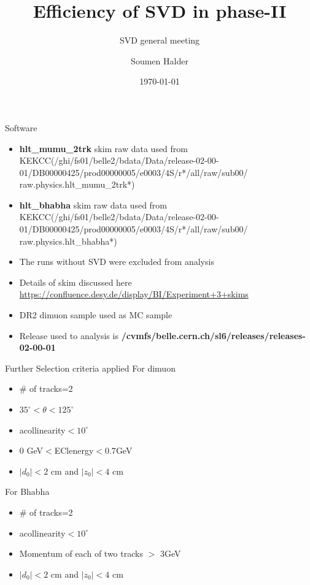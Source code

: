 \documentclass[xcolor=dvipsnames]{beamer}
\begin{document}
		\title{Efficiency of SVD in phase-II }
		   
		\author{Soumen Halder} 
		\date{\today} 
			\subtitle{ SVD general meeting }
		\frame{\titlepage}
		
\begin{frame}{Software}
	\begin{itemize}
		\item \textbf{hlt\_mumu\_2trk} skim raw data used from KEKCC(/ghi/fs01/belle2/bdata/Data/release-02-00-01/DB00000425/prod00000005/e0003/4S/r*/all/raw/sub00/\\raw.physics.hlt\_mumu\_2trk*) 
		\item \textbf{hlt\_bhabha} skim raw data used from KEKCC(/ghi/fs01/belle2/bdata/Data/release-02-00-01/DB00000425/prod00000005/e0003/4S/r*/all/raw/sub00/\\raw.physics.hlt\_bhabha*) 
		\item The runs without SVD were excluded from analysis
		\item Details of skim discussed here \\ \url{https://confluence.desy.de/display/BI/Experiment+3+skims}
		\item DR2 dimuon sample used as MC sample
		\item Release used to analysis is \textbf{/cvmfs/belle.cern.ch/sl6/releases/releases-02-00-01}
	\end{itemize}
\end{frame}
		\begin{frame}{Further Selection criteria applied }
			For dimuon
			\begin{itemize}
				\item \# of tracks=2
				\item $35^{\circ}<\theta<125^{\circ}$
				\item acollinearity$<10^{\circ}$
				\item 0 GeV$<$EClenergy$<0.7$GeV
				\item $|d_0|<2$ cm and $|z_0|<4$ cm		
			\end{itemize}
				For Bhabha
				\begin{itemize}
					\item \# of tracks=2
					
					\item acollinearity$<10^{\circ}$
				    \item Momentum of each of two tracks $>$ 3GeV 
					\item $|d_0|<2$ cm and $|z_0|<4$ cm		
				\end{itemize}
		\end{frame}
\end{document}
